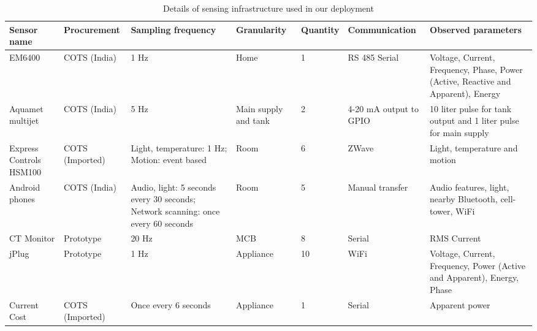 \documentclass[10pt]{sensys-proc}
\begin{document}
\begin{table}[t!]
\footnotesize
\centering
\vspace{-4mm}
\caption{Details of sensing infrastructure used in our deployment}
\vspace{-4mm}
\label{tab:sensing}
\tabcolsep=0.015cm
\begin{center}
\begin{tabular}{|p{1.7cm}|p{2.0cm}|p{3.3cm}|p{1.5cm}|p{1.5cm}|p{2.0cm}|p{5.2cm}|}
\hline
\textbf{Sensor name} & \textbf{Procurement} & \textbf{Sampling frequency} & \textbf{Granularity} & \textbf{Quantity} & \textbf{Communication} & \textbf{Observed parameters}\\
\hline

EM6400& COTS (India)&1 Hz&Home&1&RS 485 Serial&Voltage, Current, Frequency, Phase, Power (Active, Reactive and Apparent), Energy\\ \hline
Aquamet multijet & COTS (India) &5 Hz&Main supply and tank&2&4-20 mA output to GPIO &10 liter pulse for tank output and 1 liter pulse for main supply\\ \hline
Express Controls HSM100 &COTS (Imported)&Light, temperature: 1 Hz; Motion: event based &Room &6&ZWave&Light, temperature and motion\\ \hline
Android phones &COTS (India) & Audio, light: 5 seconds every 30 seconds; Network scanning: once every 60 seconds&Room&5&Manual transfer&Audio features, light, nearby Bluetooth, cell-tower, WiFi\\ \hline
CT Monitor&Prototype &20 Hz&MCB&8&Serial&RMS Current \\\hline
jPlug& Prototype &1 Hz &Appliance&10&WiFi&Voltage, Current, Frequency, Power (Active and Apparent), Energy, Phase\\ \hline	
Current Cost&COTS (Imported)& Once every 6 seconds &Appliance&1&Serial&Apparent power\\ \hline
\end{tabular}
\end{center}
\vspace{-4mm}
\end{table}
\end{document}

